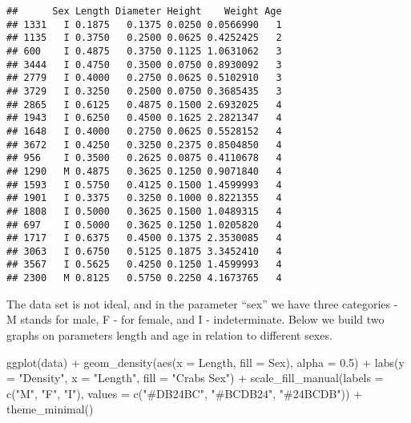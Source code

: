 \documentclass[
]{article}
\newenvironment{Shaded}{\begin{snugshade}}{\end{snugshade}}
\newcommand{\AttributeTok}[1]{\textcolor[rgb]{0.77,0.63,0.00}{#1}}
\newcommand{\FloatTok}[1]{\textcolor[rgb]{0.00,0.00,0.81}{#1}}
\newcommand{\FunctionTok}[1]{\textcolor[rgb]{0.00,0.00,0.00}{#1}}
\newcommand{\NormalTok}[1]{#1}
\newcommand{\SpecialCharTok}[1]{\textcolor[rgb]{0.00,0.00,0.00}{#1}}
\newcommand{\StringTok}[1]{\textcolor[rgb]{0.31,0.60,0.02}{#1}}
\begin{document}
\begin{verbatim}
##      Sex Length Diameter Height    Weight Age
## 1331   I 0.1875   0.1375 0.0250 0.0566990   1
## 1135   I 0.3750   0.2500 0.0625 0.4252425   2
## 600    I 0.4875   0.3750 0.1125 1.0631062   3
## 3444   I 0.4750   0.3500 0.0750 0.8930092   3
## 2779   I 0.4000   0.2750 0.0625 0.5102910   3
## 3729   I 0.3250   0.2500 0.0750 0.3685435   3
## 2865   I 0.6125   0.4875 0.1500 2.6932025   4
## 1943   I 0.6250   0.4500 0.1625 2.2821347   4
## 1648   I 0.4000   0.2750 0.0625 0.5528152   4
## 3672   I 0.4250   0.3250 0.2375 0.8504850   4
## 956    I 0.3500   0.2625 0.0875 0.4110678   4
## 1290   M 0.4875   0.3625 0.1250 0.9071840   4
## 1593   I 0.5750   0.4125 0.1500 1.4599993   4
## 1901   I 0.3375   0.3250 0.1000 0.8221355   4
## 1808   I 0.5000   0.3625 0.1500 1.0489315   4
## 697    I 0.5000   0.3625 0.1250 1.0205820   4
## 1717   I 0.6375   0.4500 0.1375 2.3530085   4
## 3063   I 0.6750   0.5125 0.1875 3.3452410   4
## 3567   I 0.5625   0.4250 0.1250 1.4599993   4
## 2300   M 0.8125   0.5750 0.2250 4.1673765   4
\end{verbatim}

The data set is not ideal, and in the parameter ``sex'' we have three
categories - M stands for male, F - for female, and I - indeterminate.
Below we build two graphs on parameters length and age in relation to
different sexes.

\begin{Shaded}
\begin{Highlighting}[]
\FunctionTok{ggplot}\NormalTok{(data) }\SpecialCharTok{+}
    \FunctionTok{geom\_density}\NormalTok{(}\FunctionTok{aes}\NormalTok{(}\AttributeTok{x =}\NormalTok{ Length, }\AttributeTok{fill =}\NormalTok{ Sex), }\AttributeTok{alpha =} \FloatTok{0.5}\NormalTok{) }\SpecialCharTok{+}
    \FunctionTok{labs}\NormalTok{(}\AttributeTok{y =} \StringTok{"Density"}\NormalTok{, }\AttributeTok{x =} \StringTok{"Length"}\NormalTok{, }\AttributeTok{fill =} \StringTok{"Crabs\textquotesingle{} Sex"}\NormalTok{) }\SpecialCharTok{+}
    \FunctionTok{scale\_fill\_manual}\NormalTok{(}\AttributeTok{labels =} \FunctionTok{c}\NormalTok{(}\StringTok{"M"}\NormalTok{, }\StringTok{"F"}\NormalTok{, }\StringTok{"I"}\NormalTok{),}
        \AttributeTok{values =} \FunctionTok{c}\NormalTok{(}\StringTok{"\#DB24BC"}\NormalTok{, }\StringTok{"\#BCDB24"}\NormalTok{, }\StringTok{"\#24BCDB"}\NormalTok{)) }\SpecialCharTok{+}
    \FunctionTok{theme\_minimal}\NormalTok{()}
\end{Highlighting}
\end{Shaded}
\end{document}
